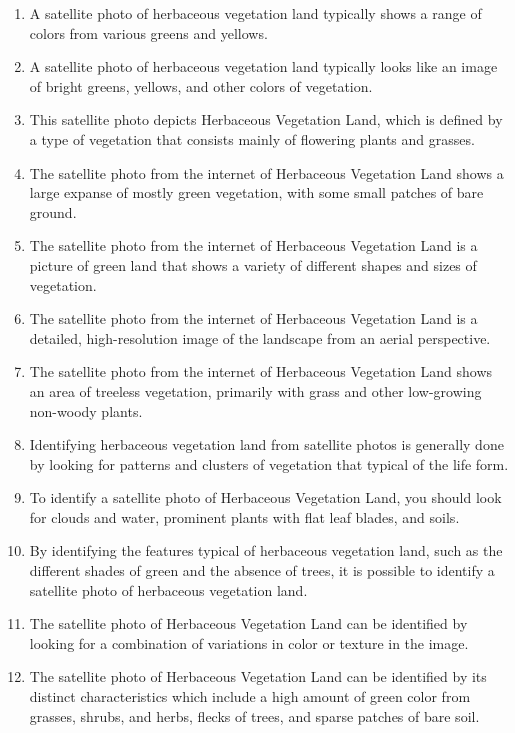 \documentclass[11pt]{article}
\begin{document}
\begin{enumerate}
\item A satellite photo of herbaceous vegetation land typically shows a range of colors from various greens and yellows.
\item A satellite photo of herbaceous vegetation land typically looks like an image of bright greens, yellows, and other colors of vegetation.
\item This satellite photo depicts Herbaceous Vegetation Land, which is defined by a type of vegetation that consists mainly of flowering plants and grasses.
\item The satellite photo from the internet of Herbaceous Vegetation Land shows a large expanse of mostly green vegetation, with some small patches of bare ground.
\item The satellite photo from the internet of Herbaceous Vegetation Land is a picture of green land that shows a variety of different shapes and sizes of vegetation.
\item The satellite photo from the internet of Herbaceous Vegetation Land is a detailed, high-resolution image of the landscape from an aerial perspective.
\item The satellite photo from the internet of Herbaceous Vegetation Land shows an area of treeless vegetation, primarily with grass and other low-growing non-woody plants.
\item Identifying herbaceous vegetation land from satellite photos is generally done by looking for patterns and clusters of vegetation that typical of the life form.
\item To identify a satellite photo of Herbaceous Vegetation Land, you should look for clouds and water, prominent plants with flat leaf blades, and soils.
\item By identifying the features typical of herbaceous vegetation land, such as the different shades of green and the absence of trees, it is possible to identify a satellite photo of herbaceous vegetation land.
\item The satellite photo of Herbaceous Vegetation Land can be identified by looking for a combination of variations in color or texture in the image.
\item The satellite photo of Herbaceous Vegetation Land can be identified by its distinct characteristics which include a high amount of green color from grasses, shrubs, and herbs, flecks of trees, and sparse patches of bare soil.
\end{enumerate}
\end{document}
